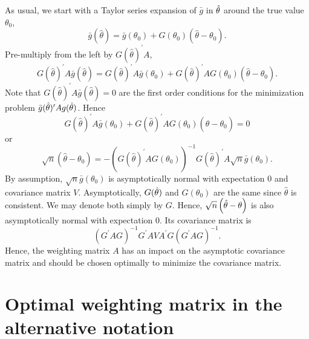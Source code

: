 \documentclass{article}
\begin{document}
As usual, we start with a Taylor series expansion of $\bar{g}$ in $\hat{%
\theta}$ around the true value $\theta _{0}$,%
\begin{equation*}
\bar{g}\left( \hat{\theta}\right) =\bar{g}\left( \theta _{0}\right) +G\left(
\theta _{0}\right) \left( \hat{\theta}-\theta _{0}\right) .
\end{equation*}%
Pre-multiply from the left by $G(\hat{\theta})^{\prime }A$,%
\begin{equation*}
G(\hat{\theta})^{\prime }A\bar{g}\left( \hat{\theta}\right) =G(\hat{\theta}%
)^{\prime }A\bar{g}\left( \theta _{0}\right) +G(\hat{\theta})^{\prime
}AG\left( \theta _{0}\right) \left( \hat{\theta}-\theta _{0}\right) .
\end{equation*}%
Note that $G(\hat{\theta})^{\prime }A\bar{g}\left( \hat{\theta}\right) =0$
are the first order conditions for the minimization problem $\bar{g}(\hat{%
\theta})^{\prime }Ag(\hat{\theta})$. Hence%
\begin{equation*}
G(\hat{\theta})^{\prime }A\bar{g}\left( \theta _{0}\right) +G(\hat{\theta}%
)^{\prime }AG\left( \theta _{0}\right) \left( \hat{\theta}-\theta
_{0}\right) =0
\end{equation*}%
or%
\begin{equation*}
\sqrt{n}\left( \hat{\theta}-\theta _{0}\right) =-\left( G(\hat{\theta}%
)^{\prime }AG\left( \theta _{0}\right) \right) ^{-1}G(\hat{\theta})^{\prime
}A\sqrt{n}\bar{g}\left( \theta _{0}\right) .
\end{equation*}%
By assumption, $\sqrt{n}\bar{g}\left( \theta _{0}\right) $ is asymptotically
normal with expectation 0 and covariance matrix $V$. Asymptotically, $G(\hat{%
\theta})$ and $G(\theta _{0})$ are the same since $\hat{\theta}$ is
consistent. We may denote both simply by $G$. Hence, $\sqrt{n}\left( \hat{%
\theta}-\theta \right) $ is also asymptotically normal with expectation 0.
Its covariance matrix is%
\begin{equation*}
\left( G^{\prime }AG\right) ^{-1}G^{\prime }AVA^{\prime }G\left( G^{\prime
}AG\right) ^{-1}.
\end{equation*}%
Hence, the weighting matrix $A$ has an impact on the asymptotic covariance
matrix and should be chosen optimally to minimize the covariance matrix.

\section{Optimal weighting matrix in the alternative notation}
\end{document}
